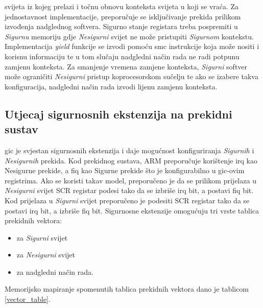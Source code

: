 \documentclass[times, utf8, diplomski, numeric]{fer}
\begin{document}
svijeta iz kojeg prelazi i točnu obnovu konteksta svijeta u koji se vraća. Za jednostavnost implementacije, preporučuje
se isključivanje prekida prilikom izvođenja nadglednog softvera. Sigurno stanje registara treba pospremiti u \textit{Sigurnu} memoriju
gdje \textit{Nesigurni} svijet ne može pristupiti \textit{Sigurnom} kontekstu. Implementacija \textit{yield} funkcije se izvodi pomoću \gls{smc}
instrukcije koja može nositi i korisnu informaciju te u tom slučaju nadgledni način rada ne radi potpunu zamjenu konteksta.
Za smanjenje vremena zamjene konteksta, \textit{Sigurni} softver može ograničiti \textit{Nesigurni} pristup koprocesorskom sučelju te ako se
izabere takva konfiguracija, nadgledni način rada izvodi lijenu zamjenu konteksta.

\subsection{Utjecaj sigurnosnih ekstenzija na prekidni sustav}
\gls{gic} je svjestan sigurnosnih ekstenzija i daje mogućnost konfiguriranja \textit{Sigurnih} i \textit{Nesigurnih} prekida. Kod prekidnog sustava,
ARM preporučuje korištenje \gls{irq} kao Nesigurne prekide, a \gls{fiq} kao Sigurne prekide što je konfigurabilno u \gls{gic}-ovim registrima.
Ako se koristi takav model, preporučeno je da se prilikom prijelaza u \textit{Nesigurni} svijet SCR registar podesi tako da se izbriše
\gls{irq} bit, a postavi \gls{fiq} bit. Kod prijelaza u \textit{Sigurni} svijet preporučeno je podesiti SCR registar tako da se postavi \gls{irq} bit, a
izbriše \gls{fiq} bit.
Sigurnosne ekstenzije omogućuju tri vrste tablica prekidnih vektora:
\begin{itemize}
  \item{za \textit{Sigurni} svijet}
  \item{za \textit{Nesigurni} svijet}
  \item{za nadgledni način rada.}
\end{itemize}
Memorijsko mapiranje spomenutih tablica prekidnih vektora dano je tablicom \ref{vector_table}.
\end{document}
